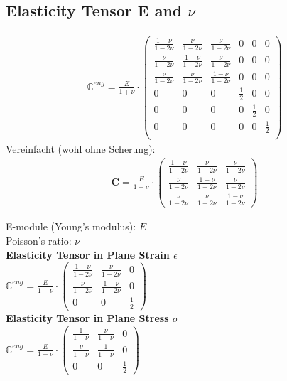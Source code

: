 \documentclass[a4paper, 10pt]{scrartcl}
\begin{document}
\subsection{Elasticity Tensor E and $\nu$}
\begin{align}
	\mathbb{C}^{eng} = \frac{E}{1 + \nu} \cdot \begin{pmatrix}
		\frac{1-\nu}{1-2\nu} & \frac{\nu}{1-2\nu} & \frac{\nu}{1-2\nu} & 0 & 0 & 0\\
		\frac{\nu}{1-2\nu} & \frac{1-\nu}{1-2\nu} & \frac{\nu}{1-2\nu} & 0 & 0 & 0\\
		\frac{\nu}{1-2\nu} & \frac{\nu}{1-2\nu} & \frac{1-\nu}{1-2\nu} & 0 & 0 & 0\\
		0 & 0 & 0 & \frac{1}{2} & 0 & 0\\
		0 & 0 & 0 & 0 & \frac{1}{2} & 0\\
		0 & 0 & 0 & 0 & 0 & \frac{1}{2}\\
	\end{pmatrix}
\end{align}
Vereinfacht (wohl ohne Scherung):
\begin{align}\label{eq:elasticity}
	\mathbf{C} = \frac{E}{1 + \nu} \cdot \begin{pmatrix}
		\frac{1-\nu}{1-2\nu} & \frac{\nu}{1-2\nu} & \frac{\nu}{1-2\nu}\\
		\frac{\nu}{1-2\nu} & \frac{1-\nu}{1-2\nu} & \frac{\nu}{1-2\nu}\\
		\frac{\nu}{1-2\nu} & \frac{\nu}{1-2\nu} & \frac{1-\nu}{1-2\nu}
	\end{pmatrix}
\end{align}

E-module (Young's modulus): $E$\\
Poisson's ratio: $\nu$\\

\textbf{Elasticity Tensor in Plane Strain $\epsilon$}\\
$\mathbb{C}^{eng} = \frac{E}{1 + \nu} \cdot \begin{pmatrix}
\frac{1-\nu}{1-2\nu} & \frac{\nu}{1-2\nu} & 0\\
\frac{\nu}{1-2\nu} & \frac{1-\nu}{1-2\nu} & 0\\
0 & 0 & \frac{1}{2}
\end{pmatrix}$\\

\textbf{Elasticity Tensor in Plane Stress $\sigma$}\\
$\mathbb{C}^{eng} = \frac{E}{1 + \nu} \cdot \begin{pmatrix}
\frac{1}{1-\nu} & \frac{\nu}{1-\nu} & 0\\
\frac{\nu}{1-\nu} & \frac{1}{1-\nu} & 0\\
0 & 0 & \frac{1}{2}
\end{pmatrix}$\\
\end{document}
